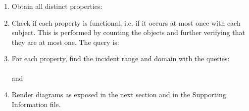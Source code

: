 \begin{enumerate}[leftmargin=0cm]
																\item Obtain all distinct properties:\\
																\item Check if each property is functional, i.e. if it
																	occurs at most once with each subject.
																							This is performed by counting the objects and further verifying
																								that they are at most one. The query is:\\
																									    \item For each property, find the incident range and domain with the
																										    queries:\\
																														 \\
																																		and \\
																																		\item Render diagrams as exposed in the next section and in the Supporting Information file.
\end{enumerate}


